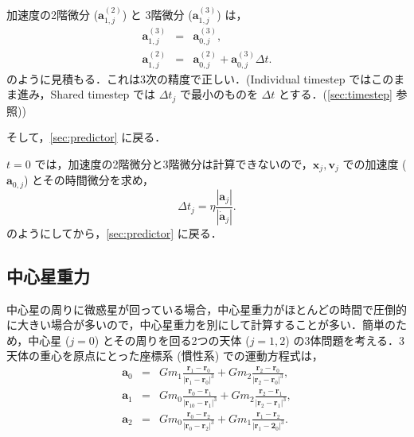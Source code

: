 \documentclass[11pt,a4paper,oneside,onecolumn]{jreport}
\begin{document}
加速度の2階微分 (${\bm a}_{1,j}^{(2)}$) と 3階微分 (${\bm a}_{1,j}^{(3)}$) は，
\begin{eqnarray}
{\bm a}_{1,j}^{(3)} & = & {\bm a}_{0,j}^{(3)}, \\
{\bm a}_{1,j}^{(2)} & = & {\bm a}_{0,j}^{(2)} + {\bm a}_{0,j}^{(3)} \Delta t. 
\end{eqnarray}
のように見積もる．これは3次の精度で正しい．(Individual timestep ではこのまま進み，Shared timestep では $\Delta t_j$ で最小のものを $\Delta t$ とする．(\ref{sec:timestep} 参照))

そして，\ref{sec:predictor} に戻る．

$t = 0$ では，加速度の2階微分と3階微分は計算できないので，${\bm x}_j,{\bm v}_j$ での加速度 (${\bm a}_{0,j}$) とその時間微分を求め，
\begin{equation}
\Delta t_j = \eta \frac{|{\bm a}_j|}{|\dot{{\bm a}}_j|}.
\end{equation}
のようにしてから，\ref{sec:predictor} に戻る．

\subsection{中心星重力}
中心星の周りに微惑星が回っている場合，中心星重力がほとんどの時間で圧倒的に大きい場合が多いので，中心星重力を別にして計算することが多い．簡単のため，中心星 ($j = 0$) とその周りを回る2つの天体 ($j = 1, 2$) の3体問題を考える．3天体の重心を原点にとった座標系 (慣性系) での運動方程式は，
\begin{eqnarray}
{\bm a}_0 & = & G m_1 \frac{{\bm r}_1 - {\bm r}_0}{|{\bm r}_1 - {\bm r}_0|^3} + G m_2  \frac{{\bm r}_2 - {\bm r}_0}{|{\bm r}_2 - {\bm r}_0|^3}, \label{eq:a0}\\
{\bm a}_1 & = & G m_0 \frac{{\bm r}_0 - {\bm r}_1}{|{\bm r}_10- {\bm r}_1|^3} + G m_2  \frac{{\bm r}_2 - {\bm r}_1}{|{\bm r}_2 - {\bm r}_1|^3}, \label{eq:a1}\\
{\bm a}_2 & = & G m_0 \frac{{\bm r}_0 - {\bm r}_2}{|{\bm r}_0 - {\bm r}_2|^3} + G m_1  \frac{{\bm r}_1 - {\bm r}_2}{|{\bm r}_1 - {\bm 2}_0|^3}. \label{eq:a2}
\end{eqnarray}
\end{document}
